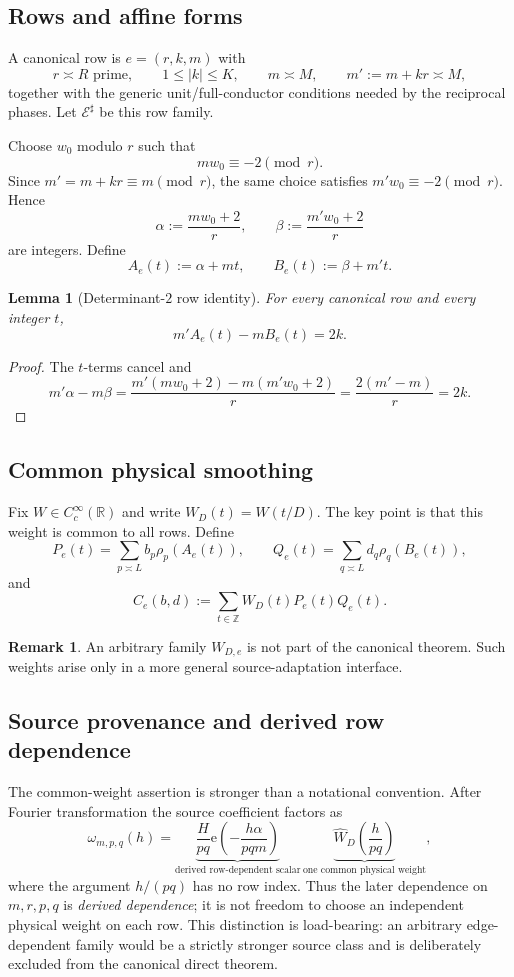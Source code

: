 \documentclass[11pt]{article}
\newtheorem{lemma}[lemma]{Lemma}
\theoremstyle{definition}
\newtheorem{remark}[remark]{Remark}
\newcommand{\e}{\mathrm e}
\newcommand{\1}{\mathbf 1}
\newcommand{\E}{\mathcal E}
\newcommand{\R}{\mathbb R}
\newcommand{\Z}{\mathbb Z}
\begin{document}
\subsection{Rows and affine forms}
A canonical row is $e=(r,k,m)$ with
\[
   r\asymp R \text{ prime},\qquad 1\le |k|\le K,\qquad
   m\asymp M,\qquad m':=m+kr\asymp M,
\]
together with the generic unit/full-conductor conditions needed by the
reciprocal phases. Let $\E^\sharp$ be this row family.

Choose $w_0$ modulo $r$ such that
\[
   mw_0\equiv -2\pmod r.
\]
Since $m'=m+kr\equiv m\pmod r$, the same choice satisfies
$m'w_0\equiv-2\pmod r$.  Hence
\[
   \alpha:=\frac{mw_0+2}{r},\qquad
   \beta:=\frac{m'w_0+2}{r}
\]
are integers.  Define
\[
   A_e(t):=\alpha+mt,\qquad
   B_e(t):=\beta+m't.
\]

\begin{lemma}[Determinant-$2$ row identity]
For every canonical row and every integer $t$,
\[
   m'A_e(t)-mB_e(t)=2k.
\]
\end{lemma}
\begin{proof}
The $t$-terms cancel and
\[
  m'\alpha-m\beta
  =\frac{m'(mw_0+2)-m(m'w_0+2)}{r}
  =\frac{2(m'-m)}r=2k.
\]
\end{proof}

\subsection{Common physical smoothing}
Fix $W\in C_c^\infty(\R)$ and write $W_D(t)=W(t/D)$. The key point is that
this weight is common to all rows. Define
\[
   P_e(t)=\sum_{p\asymp L}b_p\rho_p(A_e(t)),\qquad
   Q_e(t)=\sum_{q\asymp L}d_q\rho_q(B_e(t)),
\]
and
\begin{equation}
   C_e(b,d):=\sum_{t\in\Z}W_D(t)P_e(t)Q_e(t).
   \label{eq:Ce}
\end{equation}

\begin{remark}
An arbitrary family $W_{D,e}$ is not part of the canonical theorem. Such
weights arise only in a more general source-adaptation interface.
\end{remark}

\subsection{Source provenance and derived row dependence}
The common-weight assertion is stronger than a notational convention.  After
Fourier transformation the source coefficient factors as
\begin{equation}
  \omega_{m,p,q}(h)
  = \underbrace{\frac{H}{pq}
      \e\!\left(-\frac{h\alpha}{pqm}\right)}_{\text{derived row-dependent scalar}}
    \,\underbrace{\widehat W_D\!\left(\frac{h}{pq}\right)}_{\text{one common physical weight}},
  \label{eq:common-weight-factor}
\end{equation}
where the argument $h/(pq)$ has no row index.  Thus the later dependence on
$m,r,p,q$ is \emph{derived dependence}; it is not freedom to choose an
independent physical weight on each row.  This distinction is load-bearing:
an arbitrary edge-dependent family would be a strictly stronger source class
and is deliberately excluded from the canonical direct theorem.
\end{document}
